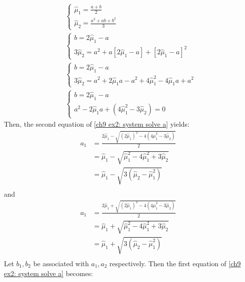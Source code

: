 \documentclass{article}
\begin{document}
\begin{align}
    \nonumber
     & \begin{cases}
        \hat\mu_1 = \frac{a + b}{2} \\
        \hat\mu_2 = \frac{a^2 + ab + b^2}{3}
    \end{cases} \\
    \nonumber
     & \begin{cases}
        b = 2\hat\mu_1 - a \\
        3\hat\mu_2 = a^2 + a\left[2\hat\mu_1 - a\right] + \left[2\hat\mu_1 - a\right]^2
    \end{cases} \\
    \nonumber
     & \begin{cases}
        b = 2\hat\mu_1 - a \\
        3\hat\mu_2 = a^2 + 2\hat\mu_1 a - a^2 + 4\hat\mu_1^2 - 4\hat\mu_1 a + a^2
    \end{cases} \\
    \label{ch9 ex2: system solve a}
     & \begin{cases}
        b = 2\hat\mu_1 - a \\
        a^2 - 2\hat\mu_1 a + (4\hat\mu_1^2 - 3\hat\mu_2) = 0
    \end{cases}
\end{align}
Then, the second equation of \eqref{ch9 ex2: system solve a} yields:
\begin{align*}
    a_1
     & = \frac{2\hat\mu_1 - \sqrt{(2\hat\mu_1)^2 - 4\left(4\hat\mu_1^2 - 3\hat\mu_2\right)}}{2} \\
     & = \hat\mu_1 - \sqrt{\hat\mu_1^2 - 4\hat\mu_1^2 + 3\hat\mu_2}                             \\
     & = \hat\mu_1 - \sqrt{3\left(\hat\mu_2 - \hat\mu_1^2\right)}                               \\
\end{align*}
and
\begin{align*}
    a_1
     & = \frac{2\hat\mu_1 + \sqrt{(2\hat\mu_1)^2 - 4\left(4\hat\mu_1^2 - 3\hat\mu_2\right)}}{2} \\
     & = \hat\mu_1 + \sqrt{\hat\mu_1^2 - 4\hat\mu_1^2 + 3\hat\mu_2}                             \\
     & = \hat\mu_1 + \sqrt{3\left(\hat\mu_2 - \hat\mu_1^2\right)}                               \\
\end{align*}
Let \(b_1, b_2\) be associated with \(a_1, a_2\) respectively. Then the first equation of \eqref{ch9 ex2: system solve a} becomes:
\end{document}
